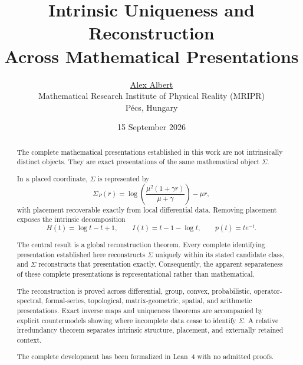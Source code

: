 \documentclass{article}
\title{
Intrinsic Uniqueness and Reconstruction\\
Across Mathematical Presentations
}
\author{
\href{https://orcid.org/0009-0005-6981-2087}{Alex Albert}\\
Mathematical Research Institute of Physical Reality (MRIPR)\\
P\'ecs, Hungary
}
\date{15 September 2026}
\theoremstyle{definition}
\theoremstyle{remark}
\begin{document}
\maketitle

\begin{abstract}
The complete mathematical presentations established in this work are not
intrinsically distinct objects. They are exact presentations of the same
mathematical object $\Sigma$.

In a placed coordinate, $\Sigma$ is represented by
\[
\Sigma_P(r)
=
\log\!\left(
\frac{\mu^2(1+\gamma r)}{\mu+\gamma}
\right)
-\mu r,
\]
with placement recoverable exactly from local differential data. Removing
placement exposes the intrinsic decomposition
\[
H(t)=\log t-t+1,
\qquad
I(t)=t-1-\log t,
\qquad
p(t)=te^{-t}.
\]

The central result is a global reconstruction theorem. Every complete
identifying presentation established here reconstructs $\Sigma$ uniquely
within its stated candidate class, and $\Sigma$ reconstructs that
presentation exactly. Consequently, the apparent separateness of these
complete presentations is representational rather than mathematical.

The reconstruction is proved across differential, group, convex,
probabilistic, operator-spectral, formal-series, topological,
matrix-geometric, spatial, and arithmetic presentations. Exact inverse
maps and uniqueness theorems are accompanied by explicit countermodels
showing where incomplete data cease to identify $\Sigma$. A relative
irredundancy theorem separates intrinsic structure, placement, and
externally retained context.

The complete development has been formalized in Lean~4 with no admitted
proofs.
\end{abstract}






\end{document}
